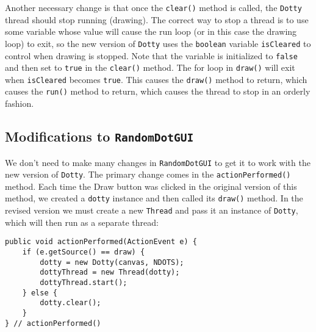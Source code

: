 Another necessary change is that once the {\tt clear()} method is
called, the {\tt Dotty} thread should stop running (drawing). The
correct way to stop a thread is to use some variable whose value will
cause the run loop (or in this case the drawing loop) to exit, so the
new version of {\tt Dotty} uses the {\tt boolean} variable
{\tt isCleared} to control when drawing is stopped.  Note that the variable
is initialized to {\tt false} and then set to {\tt true} in the
{\tt clear()} method.  The for loop in {\tt draw()} will exit when
{\tt isCleared} becomes {\tt true}. This causes the {\tt draw()} method
to return, which causes the {\tt run()} method to return, which
causes the thread to stop in an orderly fashion.



\subsection*{Modifications to {\tt RandomDotGUI}}

\noindent We don't need to make many changes in {\tt RandomDotGUI} to
get it to work with the new version of {\tt Dotty}. The primary change
comes in the {\tt actionPerformed()} method.  Each time the Draw
button was clicked in the original version of this method, we created
a {\tt dotty} instance and then called its {\tt draw()} method.  In
the revised version we must create a new {\tt Thread} and pass it
an instance of {\tt Dotty}, which will then run as a separate
thread:

\begin{jjjlisting}
\begin{lstlisting}
public void actionPerformed(ActionEvent e) { 
    if (e.getSource() == draw) { 
        dotty = new Dotty(canvas, NDOTS); 
        dottyThread = new Thread(dotty); 
        dottyThread.start(); 
    } else { 
        dotty.clear(); 
    } 
} // actionPerformed()
\end{lstlisting}
\end{jjjlisting}

